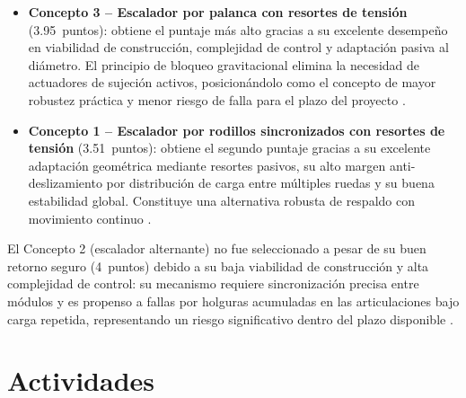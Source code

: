 \documentclass[lettersize,journal]{IEEEtran}
\begin{document}
\begin{itemize}
    \item \textbf{Concepto 3 -- Escalador por palanca con resortes de tensión}
    (3.95~puntos): obtiene el puntaje más alto gracias a su excelente desempeño en
    viabilidad de construcción, complejidad de control y adaptación pasiva al diámetro.
    El principio de bloqueo gravitacional elimina la necesidad de actuadores de sujeción
    activos, posicionándolo como el concepto de mayor robustez práctica y menor riesgo
    de falla para el plazo del proyecto \cite{Sadeghi2012HumanInspired, sibasad2017}.

    \item \textbf{Concepto 1 -- Escalador por rodillos sincronizados con resortes de
    tensión} (3.51~puntos): obtiene el segundo puntaje gracias a su excelente adaptación
    geométrica mediante resortes pasivos, su alto margen anti-deslizamiento por
    distribución de carga entre múltiples ruedas y su buena estabilidad global.
    Constituye una alternativa robusta de respaldo con movimiento continuo
    \cite{Amaran2021, GuiTangMukhopadhyay2018}.
\end{itemize}

El Concepto 2 (escalador alternante) no fue seleccionado a pesar de su buen retorno
seguro (4~puntos) debido a su baja viabilidad de construcción y alta complejidad de
control: su mecanismo requiere sincronización precisa entre módulos y es propenso a
fallas por holguras acumuladas en las articulaciones bajo carga repetida, representando
un riesgo significativo dentro del plazo disponible
\cite{DubeyEtAl2016Coconut, LamXu2011ICRA}.


\section{\textbf{Actividades}}
\end{document}
